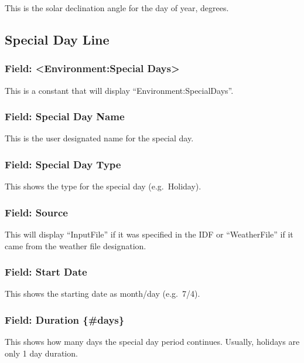 This is the solar declination angle for the day of year, degrees.

\subsection{Special Day Line}\label{special-day-line}

\subsubsection{Field: \textless{}Environment:Special Days\textgreater{}}\label{field-environmentspecial-days}

This is a constant that will display ``Environment:SpecialDays''.

\subsubsection{Field: Special Day Name}\label{field-special-day-name}

This is the user designated name for the special day.

\subsubsection{Field: Special Day Type}\label{field-special-day-type}

This shows the type for the special day (e.g.~Holiday).

\subsubsection{Field: Source}\label{field-source}

This will display ``InputFile'' if it was specified in the IDF or ``WeatherFile'' if it came from the weather file designation.

\subsubsection{Field: Start Date}\label{field-start-date-1}

This shows the starting date as month/day (e.g.~7/4).

\subsubsection{Field: Duration \{\#days\}}\label{field-duration-days-1}

This shows how many days the special day period continues. Usually, holidays are only 1 day duration.

